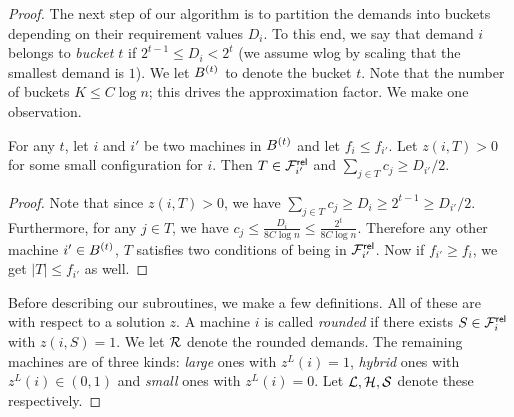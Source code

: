 \begin{proof}
	The next step of our algorithm is to partition the demands into buckets depending on their requirement values $D_i$. To this end, we say that demand $i$ belongs to \emph{bucket $t$} if
	$2^{t-1} \leq D_i < 2^t$  (we assume wlog by scaling that  the smallest demand is $1$). We let $B^{(t)}$ to denote the bucket $t$. 
		Note that the number of buckets $K \leq C\log n$; this drives the approximation factor.
We make one observation. 
\begin{claim}\label{clm:c001}
	For any $t$, let $i$ and $i'$ be two machines in $B^{(t)}$ and let $f_i \leq f_{i'}$. 
	Let $z(i,T) > 0$ for some small configuration for $i$.
Then $T\in {\cal F}^{\mathsf{rel}}_{i'}$ and $\sum_{j\in T} c_j \geq D_{i'}/2$.
\end{claim}
\begin{proof}
Note that since $z(i,T) > 0$, we have $\sum_{j\in T} c_j \geq D_{i} \geq 2^{t-1} \ge D_{i'}/2$. Furthermore, for any $j\in T$, we have $c_j \leq \frac{D_{i}}{8C\log n} \le \frac{2^t}{8C\log n}$.
Therefore any other machine $i'\in B^{(t)}$, $T$ satisfies two conditions of being in ${\cal F}^{\mathsf{rel}}_{i'}$.
Now if $f_{i'} \geq f_i$, we get $|T| \leq f_{i'}$ as well. 
\end{proof}
Before describing our subroutines, we make a few definitions. All of these are with respect to a solution $z$. 
A machine $i$ is called {\em rounded} if there exists $S\in {\cal F}^{\mathsf{rel}}_i$ with $z(i,S) = 1$. We let ${\cal R}$ denote the rounded demands.
The remaining machines are of three kinds:  {\em large} ones with $z^L(i) = 1$, {\em hybrid} ones with $z^L(i) \in (0,1)$ and {\em small} ones with $z^L(i) = 0$. 
Let ${\cal L},{\cal H},{\cal S}$ denote these respectively. 


	

\end{proof}

